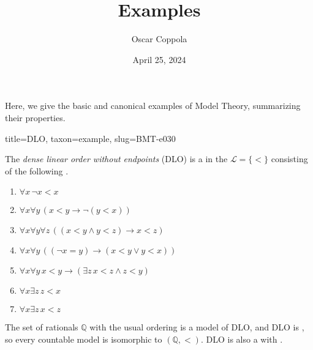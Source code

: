 \documentclass[a4paper]{article}
\title{Examples}
\date{April 25, 2024}
\author{Oscar Coppola}
\begin{document}
\maketitle
\par{
    Here, we give the basic and canonical examples of Model Theory, summarizing their properties.
}
\begin{tree}{title={DLO}, taxon={example}, slug={BMT-e030}}

    The \emph{dense linear order without endpoints} (DLO) is a  in the  \(\mathcal  L= \{ < \}\)
    consisting of the following .
    \begin{enumerate}
\item{\(\forall  x \, \neg  x<x\)}
        \item{\(\forall  x \forall  y \, (x<y \rightarrow \neg (y<x))\)}
        \item{\(\forall  x \forall  y \forall  z \, ((x<y \land  y<z) \rightarrow  x<z)\)}
        \item{\(\forall  x \forall  y \, (( \neg  x=y) \rightarrow (x<y \lor  y<x))\)}
        \item{\(\forall  x \forall  y \, x<y \rightarrow ( \exists  z \, x<z \land  z<y)\)}
        \item{\(\forall  x \exists  z \, z<x\)}
        \item{\(\forall  x \exists  z \, x<z\)}
\end{enumerate}\par{
    The set of rationals \(\mathbb  Q\) with the usual ordering is a model of DLO, and DLO is ,
    so every countable model is isomorphic to \(( \mathbb  Q,<)\). DLO is also a  with
    .
}
\end{tree}
\end{document}

